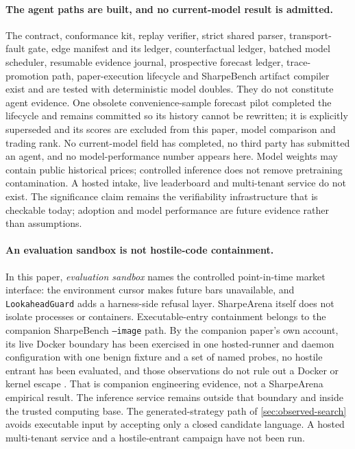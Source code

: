 \paragraph{The agent paths are built, and no current-model result is admitted.} The contract, conformance kit, replay verifier, strict shared parser, transport-fault gate, edge manifest and its ledger, counterfactual ledger, batched model scheduler, resumable evidence journal, prospective forecast ledger, trace-promotion path, paper-execution lifecycle and SharpeBench artifact compiler exist and are tested with deterministic model doubles. They do not constitute agent evidence. One obsolete convenience-sample forecast pilot completed the lifecycle and remains committed so its history cannot be rewritten; it is explicitly superseded and its scores are excluded from this paper, model comparison and trading rank. No current-model field has completed, no third party has submitted an agent, and no model-performance number appears here. Model weights may contain public historical prices; controlled inference does not remove pretraining contamination. A hosted intake, live leaderboard and multi-tenant service do not exist. The significance claim remains the verifiability infrastructure that is checkable today; adoption and model performance are future evidence rather than assumptions.

\paragraph{An evaluation sandbox is not hostile-code containment.} In this paper, \emph{evaluation sandbox} names the controlled point-in-time market interface: the environment cursor makes future bars unavailable, and \texttt{LookaheadGuard} adds a harness-side refusal layer. SharpeArena itself does not isolate processes or containers. Executable-entry containment belongs to the companion SharpeBench \texttt{--image} path. By the companion paper's own account, its live Docker boundary has been exercised in one hosted-runner and daemon configuration with one benign fixture and a set of named probes, no hostile entrant has been evaluated, and those observations do not rule out a Docker or kernel escape \citep{toca2026sharpebench}. That is companion engineering evidence, not a SharpeArena empirical result. The inference service remains outside that boundary and inside the trusted computing base. The generated-strategy path of \cref{sec:observed-search} avoids executable input by accepting only a closed candidate language. A hosted multi-tenant service and a hostile-entrant campaign have not been run.

